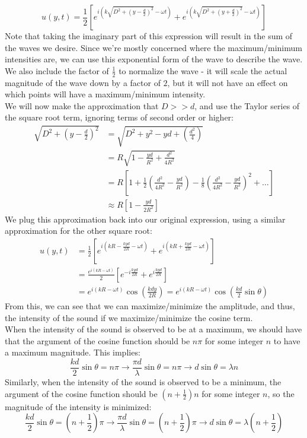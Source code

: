 \[
	u(y, t) = \frac{1}{2} \left[ e^{i \left(k \sqrt{D^2 + \left(y - \frac{d}{2} \right)^2} - \omega t\right)} + e^{i \left(k \sqrt{D^2 + \left(y + \frac{d}{2} \right)^2} - \omega t\right)} \right]
\]
Note that taking the imaginary part of this expression will result in the sum of the waves we desire. Since we're mostly concerned where the maximum/minimum intensities are, we can use this exponential form of the wave to describe the wave. We also include the factor of $\frac{1}{2}$ to normalize the wave - it will scale the actual magnitude of the wave down by a factor of $2$, but it will not have an effect on which points will have a maximum/minimum intensity.\\
We will now make the approximation that $D >> d$, and use the Taylor series of the square root term, ignoring terms of second order or higher: 
\begin{align*}
	\sqrt{D^2 + \left(y - \frac{d}{2} \right)^2} &= \sqrt{D^2 + y^2 - yd + \left( \frac{d^2}{4} \right)} \\
	&= R \sqrt{1 - \frac{yd}{R^2} + \frac{d^2}{4R^2}} \\
	&= R \left[1 + \frac{1}{2}\left(\frac{d^2}{4R^2} - \frac{yd}{R^2}\right) - \frac{1}{8}\left(\frac{d^2}{4R^2} - \frac{yd}{R^2}\right)^2 + \ldots \right] \\
	&\approx R\left[1 - \frac{yd}{2R^2} \right] 
\end{align*}
We plug this approximation back into our original expression, using a similar approximation for the other square root: 
\begin{align*}
	u(y, t) &= \frac{1}{2} \left[ e^{i \left(kR - \frac{kyd}{2R} - \omega t\right)} + e^{i \left(k R + \frac{kyd}{2R} - \omega t\right)} \right] \\
	&= \frac{e^{i \left(kR - \omega t\right)}}{2} \left[ e^{- i\frac{kyd}{2R}} + e^{i\frac{kyd}{2R}} \right] \\
	&= e^{i \left(kR - \omega t\right)} \cos \left( \frac{kdy}{2R}\right) = e^{i \left(kR - \omega t\right)} \cos \left( \frac{kd}{2} \sin \theta \right)
\end{align*}
From this, we can see that we can maximize/minimize the amplitude, and thus, the intensity of the sound if we maximize/minimize the cosine term. \\
When the intensity of the sound is observed to be at a maximum, we should have that the argument of the cosine function should be $n \pi$ for some integer $n$ to have a maximum magnitude. This implies:
\[
	\frac{kd}{2}\sin \theta = n \pi  \rightarrow \frac{\pi d}{\lambda}\sin \theta = n \pi \rightarrow d\sin \theta = \lambda n 
\] 
Similarly, when the intensity of the sound is observed to be a minimum, the argument of the cosine function should be $\left( n + \frac{1}{2} \right) n$ for some integer $n$, so the magnitude of the intensity is minimized:
\[
	\frac{kd}{2}\sin \theta = \left( n + \frac{1}{2} \right) \pi  \rightarrow \frac{\pi d}{\lambda}\sin \theta = \left( n + \frac{1}{2} \right) \pi \rightarrow d\sin \theta = \lambda \left( n + \frac{1}{2} \right) 
\]
